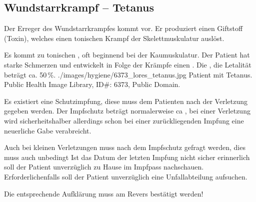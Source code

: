 


\subsection{Wundstarrkrampf -- Tetanus}





Der Erreger des Wundstarrkrampfes kommt
 vor. Er produziert einen Giftstoff (Toxin),
welches einen tonischen Krampf der Skelettmuskulatur
auslöst. 


{
Es kommt zu tonischen , oft beginnend bei der
Kaumuskulatur. Der Patient hat starke Schmerzen und
entwickelt in Folge der Krämpfe einen . Die
, die Letalität beträgt ca.
50\,\%.
}
{
}
{./images/hygiene/6373_lores_tetanus.jpg}
{Patient mit Tetanus.}
{Public Health Image Library, ID\#: 6373, Public Domain.}

{
\label{topic:tetanus-impfschutz}
Es existiert
eine Schutzimpfung, diese muss dem Patienten  nach der
Verletzung gegeben werden. Der Impfschutz beträgt
normalerweise ca , bei einer
Verletzung wird sicherheitshalber allerdings schon bei einer
 zurückliegenden Impfung eine neuerliche Gabe verabreicht.

Auch bei kleinen Verletzungen muss nach dem Impfschutz
gefragt werden, dies muss auch unbedingt  Ist das Datum der letzten Impfung nicht
sicher erinnerlich soll der Patient unverzüglich zu Hause im
Impfpass nachschauen. Erforderlichenfalls soll der Patient
unverzüglich eine Unfallabteilung aufsuchen. 

Die entsprechende Aufklärung muss am Revers bestätigt werden!
}
{
}
{}
{}
{}

